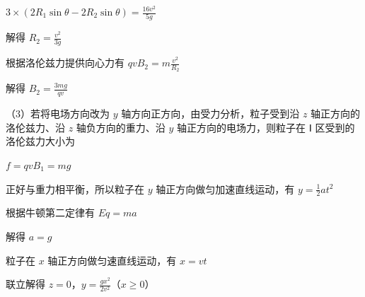 \documentclass[\gkver]{gaokaozhenti}
\begin{document}
\begin{enumerate}
{$3 \times (2R_{1}\sin\theta - 2R_{2}\sin\theta) = \frac{16v^{2}}{5g}$

解得 $R_{2} = \frac{v^{2}}{3g}$

根据洛伦兹力提供向心力有 $qvB_{2} = m\frac{v^{2}}{R_{2}}$

解得 $B_{2} = \frac{3mg}{qv}$

（3）若将电场方向改为 $y$ 轴方向正方向，由受力分析，粒子受到沿 $z$ 轴正方向的洛伦兹力、沿 $z$ 轴负方向的重力、沿 $y$ 轴正方向的电场力，则粒子在 Ⅰ 区受到的洛伦兹力大小为

$f = qvB_{1} = mg$

正好与重力相平衡，所以粒子在 $y$ 轴正方向做匀加速直线运动，有 $y = \frac{1}{2}at^{2}$

根据牛顿第二定律有 $Eq = ma$

解得 $a = g$

粒子在 $x$ 轴正方向做匀速直线运动，有 $x = vt$

联立解得 $z=0$，$y = \frac{gx^{2}}{2v^{2}}$（$x\geq0$）
}

\end{enumerate}
\end{document}
